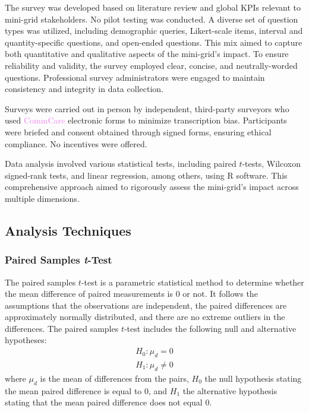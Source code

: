 The survey was developed based on literature review and global KPIs relevant to mini-grid stakeholders. No pilot testing was conducted. A diverse set of question types was utilized, including demographic queries, Likert-scale items, interval and quantity-specific questions, and open-ended questions. This mix aimed to capture both quantitative and qualitative aspects of the mini-grid's impact. To ensure reliability and validity, the survey employed clear, concise, and neutrally-worded questions. Professional survey administrators were engaged to maintain consistency and integrity in data collection.

Surveys were carried out in person by independent, third-party surveyors who used \textcolor{violet}{CommCare} electronic forms to minimize transcription bias. Participants were briefed and consent obtained through signed forms, ensuring ethical compliance. No incentives were offered.

Data analysis involved various statistical tests, including paired $t$-tests, Wilcoxon signed-rank tests, and linear regression, among others, using R software. This comprehensive approach aimed to rigorously assess the mini-grid's impact across multiple dimensions.

\subsection{Analysis Techniques}
\subsubsection{Paired Samples \textit{t}-Test}
\hfill \break
The paired samples $t$-test is a parametric statistical method to determine whether the mean difference of paired measurements is 0 or not. It follows the assumptions that the observations are independent, the paired differences are approximately normally distributed, and there are no extreme outliers in the differences. The paired samples $t$-test includes the following null and alternative hypotheses:
\begin{equation}
\begin{array}{c}
    H_0 : \mu_d = 0 \\
    H_1 :  \mu_d \neq 0
\end{array}
\end{equation}
where $\mu_d$ is the mean of differences from the pairs, $H_0$ the null hypothesis stating the mean paired difference is equal to 0, and $H_1$ the alternative hypothesis stating that the mean paired difference does not equal 0.

